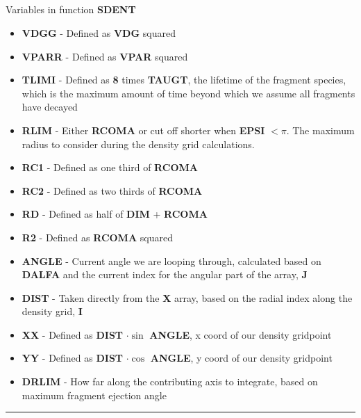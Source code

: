\documentclass[11pt]{article}
\newcommand{\problempart}[1]{\subsection*{\contour{mybblack}{\textcolor{myblack}{#1}}}}
\newcommand{\fortranvar}[1]{\textcolor{myblue}{\textbf{#1}}}
\newcommand{\magicnumber}[1]{\textcolor{myred}{\textbf{#1}}}
\begin{document}
\problempart{Density Calcultion, SDENT}
Variables in function \fortranvar{SDENT}
\begin{itemize}
    \item \fortranvar{VDGG} - Defined as \fortranvar{VDG} squared
    \item \fortranvar{VPARR} - Defined as \fortranvar{VPAR} squared
    \item \fortranvar{TLIMI} - Defined as \magicnumber{8} times \fortranvar{TAUGT}, the lifetime of the fragment species, which is the maximum amount of time beyond which we assume all fragments have decayed
    \item \fortranvar{RLIM} - Either \fortranvar{RCOMA} or cut off shorter when \fortranvar{EPSI} \(< \pi\).  The maximum radius to consider during the density grid calculations.
    \item \fortranvar{RC1} - Defined as one third of \fortranvar{RCOMA}
    \item \fortranvar{RC2} - Defined as two thirds of \fortranvar{RCOMA}
    \item \fortranvar{RD} - Defined as half of \fortranvar{DIM} + \fortranvar{RCOMA}
    \item \fortranvar{R2} - Defined as \fortranvar{RCOMA} squared
    \item \fortranvar{ANGLE} - Current angle we are looping through, calculated based on \fortranvar{DALFA} and the current index for the angular part of the array, \fortranvar{J}
    \item \fortranvar{DIST} - Taken directly from the \fortranvar{X} array, based on the radial index along the density grid, \fortranvar{I}
    \item \fortranvar{XX} - Defined as \fortranvar{DIST} \(\cdot \sin\) \fortranvar{ANGLE}, x coord of our density gridpoint
    \item \fortranvar{YY} - Defined as \fortranvar{DIST} \(\cdot \cos\) \fortranvar{ANGLE}, y coord of our density gridpoint
    \item \fortranvar{DRLIM} - How far along the contributing axis to integrate, based on maximum fragment ejection angle
\end{itemize}


\vspace{1em}
\hrule
\end{document}
